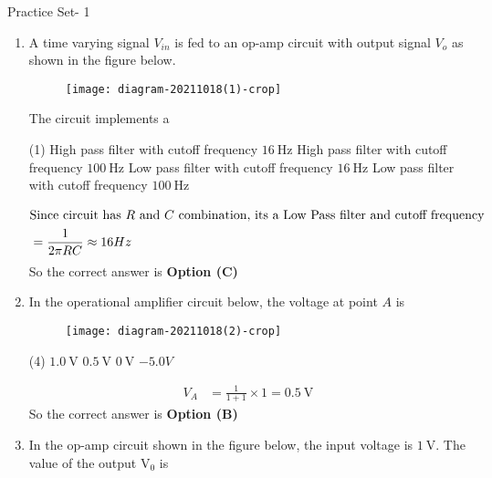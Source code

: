 \begin{abox}
	Practice Set- 1
\end{abox}
\begin{enumerate}
	\item A time varying signal $V_{i n}$ is fed to an op-amp circuit with output signal $V_{o}$ as shown in the figure below.\\
	\begin{figure}[H]
		\centering
		\texttt{[image: diagram-20211018(1)-crop]}
	\end{figure}
	The circuit implements a
	{}
	\begin{tasks}(1)
		\task[\textbf{A.}] High pass filter with cutoff frequency $16 \mathrm{~Hz}$
		\task[\textbf{B.}] High pass filter with cutoff frequency $100 \mathrm{~Hz}$
		\task[\textbf{C.}] Low pass filter with cutoff frequency $16 \mathrm{~Hz}$
		\task[\textbf{D.}] Low pass filter with cutoff frequency $100 \mathrm{~Hz}$
	\end{tasks}
\begin{answer}
	\begin{align*}
	\intertext{Since circuit has $R$ and $C$ combination, its a Low Pass filter and cutoff frequency}
	&=\frac{1}{2 \pi R C} \approx 16 H z
	\end{align*}
	So the correct answer is \textbf{Option (C)}
\end{answer}
	\item In the operational amplifier circuit below, the voltage at point $A$ is
	{	}
	\begin{figure}[H]
		\centering
		\texttt{[image: diagram-20211018(2)-crop]}
	\end{figure}
	\begin{tasks}(4)
		\task[\textbf{A.}] $1.0 \mathrm{~V}$
		\task[\textbf{B.}] $0.5 \mathrm{~V}$
		\task[\textbf{C.}] $0 \mathrm{~V}$
		\task[\textbf{D.}] $-5.0 V$
	\end{tasks}
\begin{answer}
	\begin{align*}
	V_{A}&=\frac{1}{1+1} \times 1=0.5 \mathrm{~V}
	\end{align*}
	So the correct answer is \textbf{Option (B)}
\end{answer}
	\item In the op-amp circuit shown in the figure below, the input voltage is $1 \mathrm{~V}$. The value of the output $\mathrm{V}_{0}$ is
	{}
	\begin{figure}[H]

\end{figure}
\end{enumerate}
